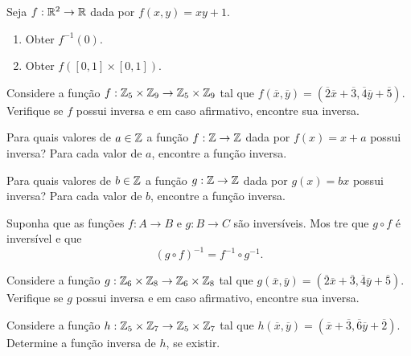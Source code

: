 \documentclass[12pt]{exam}
\begin{document}
    \vspace{.3cm}

    \questao{} Seja $f: \mathbb{R}^2 \to \mathbb{R}$ dada por $f(x,y) = xy + 1$.
    \begin{enumerate}[label={\alph*})]
        \item Obter $f^{-1}({0})$.

        \item Obter $f([0,1]\times [0,1])$.
    \end{enumerate}

    \vspace{.3cm}


    \questao{} Considere a fun{\c c}{\~a}o $f : \mathbb{Z}_5 \times \mathbb{Z}_9 \to \mathbb{Z}_5 \times \mathbb{Z}_9$ tal que $f(\overline{x},\overline{y}) = (\overline{2} \overline{x} + \overline{3}, \overline{4}\overline{y} + \overline{5})$. Verifique se $f$ possui inversa e em caso afirmativo, encontre sua inversa.

    \vspace{.3cm}

    \questao{} Para quais valores de $a \in \mathbb{Z}$ a função $f : \mathbb{Z} \to \mathbb{Z}$ dada por $f(x)       = x + a$ possui inversa? Para cada valor de $a$, encontre a função inversa.

    \vspace{.3cm}

    \questao{} Para quais valores de $b \in \mathbb{Z}$ a função $g : \mathbb{Z} \to \mathbb{Z}$ dada por $g(x)       = bx$ possui inversa? Para cada valor de $b$, encontre a função inversa.

    \vspace{.3cm}

    \questao{} Suponha que as funções $f : A \to B$ e $g : B \to C$ são inversíveis. Mos      tre que $g \circ f$ é inversível e que
    \[
        (g \circ f)^{-1} = f^{-1} \circ g^{-1}.
    \]

    \vspace{.3cm}

    \questao{} Considere a fun{\c c}{\~a}o $g : \mathbb{Z}_6 \times \mathbb{Z}_8 \to \mathbb{Z}_6 \times \mathbb{Z}_8$ tal que $g(\overline{x},\overline{y}) = (\overline{2} \overline{x} + \overline{3}, \overline{4}\overline{y} + \overline{5})$. Verifique se $g$ possui inversa e em caso afirmativo, encontre sua inversa.

    \vspace{.3cm}

    \questao{} Considere a fun{\c c}{\~a}o $h : \mathbb{Z}_5 \times \mathbb{Z}_7 \to \mathbb{Z}_5 \times \mathbb{Z}_7$ tal que $h(\overline{x},\overline{y}) = (\overline{x} + \overline{3}, \overline{6}\overline{y} + \overline{2})$. Determine a fun\c{c}\~ao inversa de $h$, se existir.
\end{document}
